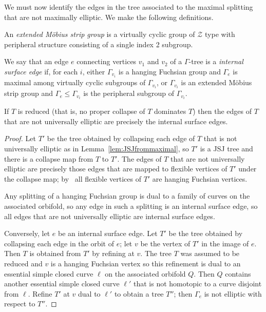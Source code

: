 We must now identify the edges in the tree associated to the maximal splitting
that are not maximally elliptic. We make the following definitions.

\begin{defn}\label{defn:mobiusstripgroup} An \emph{extended M\"obius strip
group} is a virtually cyclic group of $\mathcal{Z}$ type with peripheral
structure consisting of a single index 2 subgroup.\end{defn}

\begin{defn}\label{defn:surfaceboundaryedges} We say that an edge $e$
connecting vertices $v_1$ and $v_2$ of a $\Gamma$-tree is a \emph{internal
surface edge} if, for each $i$, either $\Gamma_{v_i}$ is a hanging Fuchsian
group and $\Gamma_e$ is maximal among virtually cyclic subgroups of
$\Gamma_{v_i}$, or $\Gamma_{v_i}$ is an extended M\"obius strip group and
$\Gamma_e \leq \Gamma_{v_i}$ is the peripheral subgroup of $\Gamma_{v_i}$.
\end{defn}

\begin{lem}\label{lem:nonuniversallyellipticedges} If $T$ is reduced (that
is, no proper collapse of $T$ dominates $T$) then the edges of
$T$ that are not universally elliptic are precisely the internal surface
edges.\end{lem}

\begin{proof} Let $T'$ be the tree obtained by collapsing each edge of
$T$ that is not universally elliptic as in
Lemma~\ref{lem:JSJfrommaximal}, so $T'$ is a JSJ tree and there is a
collapse map from $T$ to $T'$. The edges of $T$ that are not
universally elliptic are precisely those edges that are mapped to flexible
vertices of $T'$ under the collapse map; by~\cite[Theorem
6.2]{guirardellevitt16} all flexible vertices of $T'$ are hanging
Fuchsian vertices. 

Any splitting of a hanging Fuchsian group is dual to a family of curves on the
associated orbifold, so any edge in such a splitting is an internal surface
edge, so all edges that are not universally elliptic are internal surface
edges.

Conversely, let $e$ be an internal surface edge. Let $T'$ be the tree
obtained by collapsing each edge in the orbit of $e$; let $v$ be the vertex of
$T'$ in the image of $e$. Then $T$ is obtained from $T'$ by
refining at $v$. The tree $T$ was assumed to be reduced and $v$ is a
hanging Fuchsian vertex so this refinement is dual to an essential simple
closed curve $\ell$ on the associated orbifold $Q$. Then $Q$ contains another
essential simple closed curve $\ell'$ that is not homotopic to a curve disjoint
from $\ell$. Refine $T'$ at $v$ dual to $\ell'$ to obtain a tree
$T''$; then $\Gamma_e$ is not elliptic with respect to $T''$.
\end{proof}


